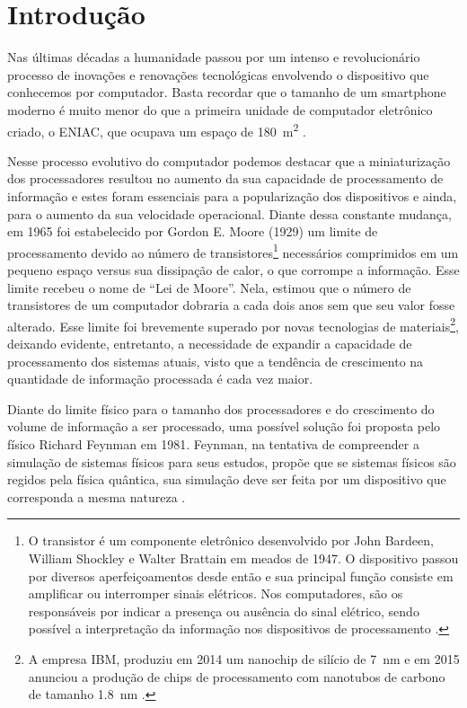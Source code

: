 \chapter{Introdução}

Nas últimas décadas a humanidade passou por um intenso e revolucionário processo de inovações e renovações tecnológicas envolvendo o dispositivo que conhecemos por computador. Basta recordar que o tamanho de um smartphone moderno é muito menor do que a primeira unidade de computador eletrônico criado, o ENIAC, que ocupava um espaço de \SI{180}{\square\meter} \cite{eniac}.

Nesse processo evolutivo do computador podemos destacar que a miniaturização dos processadores resultou no aumento da sua capacidade de processamento de informação e estes foram essenciais para a popularização dos dispositivos e ainda, para o aumento da sua velocidade operacional. Diante dessa constante mudança, em 1965 foi estabelecido por Gordon E. Moore (1929) um limite de processamento devido ao número de transistores\footnote{O transistor é um componente eletrônico desenvolvido por John Bardeen, William Shockley e Walter Brattain em meados de 1947. O dispositivo passou por diversos aperfeiçoamentos desde então e sua principal função consiste em amplificar ou interromper sinais elétricos. Nos computadores, são os responsáveis por indicar a presença ou ausência do sinal elétrico, sendo possível a interpretação da informação nos dispositivos de processamento \cite{transistor}.} necessários comprimidos em um pequeno espaço versus sua dissipação de calor, o que corrompe a informação. Esse limite recebeu o nome de ``Lei de Moore''. Nela, \textcite{moore} estimou que o número de transistores de um computador dobraria a cada dois anos sem que seu valor fosse alterado. Esse limite foi brevemente superado por novas tecnologias de materiais\footnote{A empresa IBM, produziu em 2014 um nanochip de silício de \SI{7}{\nano\meter} e em 2015 anunciou a produção de chips de processamento com nanotubos de carbono de tamanho \SI{1.8}{\nano\meter} \cite{chipibm}.}, deixando evidente, entretanto, a necessidade de expandir a capacidade de processamento dos sistemas atuais, visto que a tendência de crescimento na quantidade de informação processada é cada vez maior.

Diante do limite físico para o tamanho dos processadores e do crescimento do volume de informação a ser processado, uma possível solução foi proposta pelo físico Richard Feynman em 1981. Feynman, na tentativa de compreender a simulação de sistemas físicos para seus estudos, propõe que se sistemas físicos são regidos pela física quântica, sua simulação deve ser feita por um dispositivo que corresponda a mesma natureza \cite{caldeira}.

